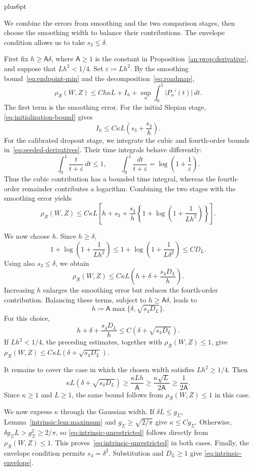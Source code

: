 \documentclass[11pt,letterpaper,twoside,leqno]{article}
\makeatletter
\theoremstyle{bookplain}
\theoremstyle{bookremark}
\renewenvironment{proof}[1][\proofname]{\par
  \pushQED{\qed}\normalfont\topsep6pt plus6pt\relax
  \trivlist\item[\hskip\labelsep\bfseries #1\@addpunct{.}]\ignorespaces
}{\popQED\endtrivlist\@endpefalse}
\newcommand{\rh}{\rho_{\mathcal R}}
\makeatother
\begin{document}
{
\begin{proof}[Proof of Theorem~\ref{thm:unrestricted}]
We combine the errors from smoothing and the two comparison stages,
then choose the smoothing width to balance their contributions.
The envelope condition allows us to take \(s_3\le\delta\).

First fix \(h\ge\mathsf A\delta\), where \(\mathsf A\ge1\) is the
constant in Proposition~\ref{an:prop:derivative}, and suppose that
\(Lh^2<1/4\). Set \(\varepsilon\coloneqq Lh^2\). By the smoothing
bound~\eqref{eq:endpoint-min} and the decomposition~\eqref{eq:roadmap},
\[
 \rh(W,Z)
 \le Ch\kappa L+I_h+\sup_a\int_0^1|P_a'(t)|\,dt.
\]
The first term is the smoothing error. For the initial Slepian stage,
\eqref{eq:initialization-bound} gives
\[
 I_h\le C\kappa L\left(s_3+\frac{s_4}{h}\right).
\]
For the calibrated dropout stage, we integrate the cubic and
fourth-order bounds in~\eqref{eq:seeded-derivatives}. Their time
integrals behave differently:
\[
 \int_0^1\frac{t}{t+\varepsilon}\,dt\le1,
 \qquad
 \int_0^1\frac{dt}{t+\varepsilon}
 =\log\!\left(1+\frac1\varepsilon\right).
\]
Thus the cubic contribution has a bounded time integral, whereas the
fourth-order remainder contributes a logarithm. Combining the two
stages with the smoothing error yields
\[
 \rh(W,Z)\le C\kappa L\left[
 h+s_3+\frac{s_4}{h}
 \left\{1+\log\!\left(1+\frac1{Lh^2}\right)\right\}
 \right].
\]

We now choose \(h\). Since \(h\ge\delta\),
\[
 1+\log\!\left(1+\frac1{Lh^2}\right)
 \le1+\log\!\left(1+\frac1{L\delta^2}\right)
 \le CD_L.
\]
Using also \(s_3\le\delta\), we obtain
\[
 \rh(W,Z)\le C\kappa L
 \left(h+\delta+\frac{s_4D_L}{h}\right).
\]
Increasing \(h\) enlarges the smoothing error but reduces the
fourth-order contribution. Balancing these terms, subject to
\(h\ge\mathsf A\delta\), leads to
\[
 h\coloneqq\mathsf A\max\{\delta,\sqrt{s_4D_L}\}.
\]
For this choice,
\[
 h+\delta+\frac{s_4D_L}{h}
 \le C\left(\delta+\sqrt{s_4D_L}\right).
\]
If \(Lh^2<1/4\), the preceding estimates, together with
\(\rh(W,Z)\le1\), give \(\rh(W,Z)\le C\kappa L(\delta+\sqrt{s_4D_L})\).

It remains to cover the case in which the chosen width satisfies
\(Lh^2\ge1/4\). Then
\[
 \kappa L\left(\delta+\sqrt{s_4D_L}\right)
 \ge\frac{\kappa Lh}{\mathsf A}
 \ge\frac{\kappa\sqrt L}{2\mathsf A}
 \ge\frac1{2\mathsf A}.
\]
Since \(\kappa\ge1\) and \(L\ge1\), the same bound follows
from \(\rh(W,Z)\le1\) in this case.

We now express \(\kappa\) through the Gaussian width. If
\(\delta L\le g_\Sigma\), Lemma~\ref{intrinsic:lem:maximum} and
\(g_\Sigma\ge\sqrt{2/\pi}\) give \(\kappa\le Cg_\Sigma\).
Otherwise, \(\delta g_\Sigma L>g_\Sigma^2\ge2/\pi\), so
\eqref{eq:intrinsic-unrestricted} follows directly from
\(\rh(W,Z)\le1\). This proves~\eqref{eq:intrinsic-unrestricted}
in both cases. Finally, the envelope condition permits
\(s_4=\delta^2\). Substitution and \(D_L\ge1\) give
\eqref{eq:intrinsic-envelope}.
\end{proof}
}
\end{document}
